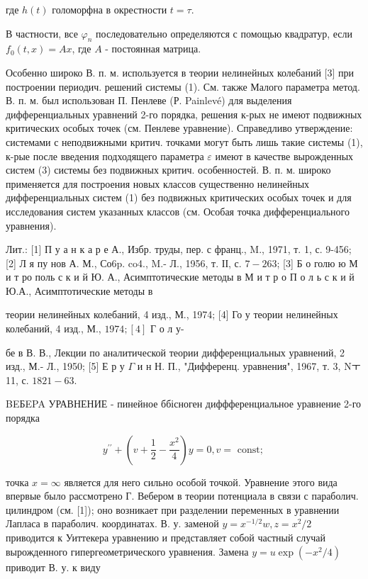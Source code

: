 \documentclass[10pt]{article}
\begin{document}
где $h(t)$ голоморфна в окрестности $t=\tau$.



В частности, все $\varphi_{n}$ последовательно определяются с помощью квадратур, если $f_{0}(t, x)=A x$, где $A$ - постоянная матрица.



Особенно широко В. п. м. используется в теории нелинейных колебаний [3] при построении периодич. решений системы (1). См. также Малого параметра метод. В. п. м. был использован П. Пенлеве (Р. Painlevé) для выделения дифференциальных уравнений 2-го порядка, решения к-рых не имеют подвижных критических особых точек (см. Пенлеве уравнение). Справедливо утверждение: системами с неподвижными критич. точками могут быть лишь такие системы (1), к-рые после введения подходящего параметра $\varepsilon$ имеют в качестве вырожденных систем (3) системы без подвижных критич. особенностей. В. п. м. широко применяется для построения новых классов существенно нелинейных дифференциальных систем (1) без подвижных критических особых точек и для исследования систем указанных классов (см. Особая точка дифференциального уравнения).



Лит.: [1] П у а н к а р е А., Избр. труды, пер. с франц., M., 1971, т. 1, с. 9-456; [2] Л я пу нов А. М., Со6p. co4., M.- Л., 1956, т. ІІ, с. $7-263$; [3] Б о голю ю М и т ро поль с к и й Ю. А., Асимптотические методы в М и т р о П о л ь с к и й Ю.А., Асимптотические методы в

теории нелинейных колебаний, 4 изд., М., 1974; [4] Го у теории нелинейных колебаний, 4 изд., М., $1974 ;[4]$ Г о л у-

бе в В. В., Лекции по аналитической теории дифференциальных уравнений, 2 изд., М.- Л., 1950; [5] Е р у $\Gamma$ и н Н. П., "Дифференц. уравнения", 1967, т. 3, Nㅜ 11, с. $1821-63$.



BEБEPA УРАВНЕНИЕ - пинейное ббісноген диффференциальное уравнение 2-го порядка



\[

y^{\prime \prime}+\left(v+\frac{1}{2}-\frac{x^{2}}{4}\right) y=0, v=\text { const; }

\]



точка $x=\infty$ является для него сильно особой точкой. Уравнение этого вида впервые было рассмотрено Г. Вебером в теории потенциала в связи с параболич. цилиндром (см. [1]); оно возникает при разделении переменных в уравнении Лапласа в параболич. координатах. В. у. заменой $y=x^{-1 / 2} w, z=x^{2} / 2$ приводится к Уиттекера уравнению и представляет собой частный случай вырожденного гипергеометрического уравнения. Замена $y=u \exp \left(-x^{2} / 4\right)$ приводит В. у. к виду
\end{document}
